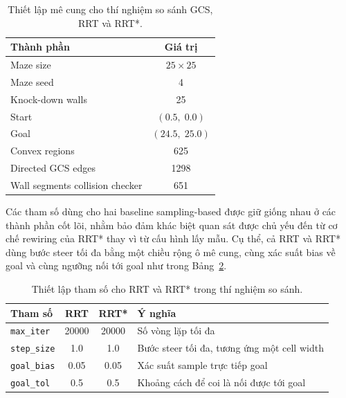 \begin{table}[!htp]
    \centering
    \caption{Thiết lập mê cung cho thí nghiệm so sánh GCS, RRT và RRT*.}
    \label{tab:rrt_compare_maze_setup}
    \begin{tabular}{lc}
        \toprule
        \textbf{Thành phần} & \textbf{Giá trị} \\
        \midrule
        Maze size & $25\times 25$ \\
        Maze seed & 4 \\
        Knock-down walls & 25 \\
        Start & $(0.5,\;0.0)$ \\
        Goal & $(24.5,\;25.0)$ \\
        Convex regions & 625 \\
        Directed GCS edges & 1298 \\
        Wall segments collision checker & 651 \\
        \bottomrule
    \end{tabular}
\end{table}

Các tham số dùng cho hai baseline sampling-based được giữ giống nhau ở các thành
phần cốt lõi, nhằm bảo đảm khác biệt quan sát được chủ yếu đến từ cơ chế
rewiring của RRT* thay vì từ cấu hình lấy mẫu. Cụ thể, cả RRT và RRT* dùng bước
steer tối đa bằng một chiều rộng ô mê cung, cùng xác suất bias về goal và cùng
ngưỡng nối tới goal như trong Bảng~\ref{tab:rrt_compare_planner_setup}.

\begin{table}[!htp]
    \centering
    \caption{Thiết lập tham số cho RRT và RRT* trong thí nghiệm so sánh.}
    \label{tab:rrt_compare_planner_setup}
    \begin{tabularx}{\textwidth}{lcc>{\raggedright\arraybackslash}X}
        \toprule
        \textbf{Tham số} & \textbf{RRT} & \textbf{RRT*} & \textbf{Ý nghĩa} \\
        \midrule
        \texttt{max\_iter} & 20000 & 20000 & Số vòng lặp tối đa \\
        \texttt{step\_size} & 1.0 & 1.0 & Bước steer tối đa, tương ứng một cell width \\
        \texttt{goal\_bias} & 0.05 & 0.05 & Xác suất sample trực tiếp goal \\
        \texttt{goal\_tol} & 0.5 & 0.5 & Khoảng cách để coi là nối được tới goal \\
        \bottomrule
    \end{tabularx}
\end{table}


